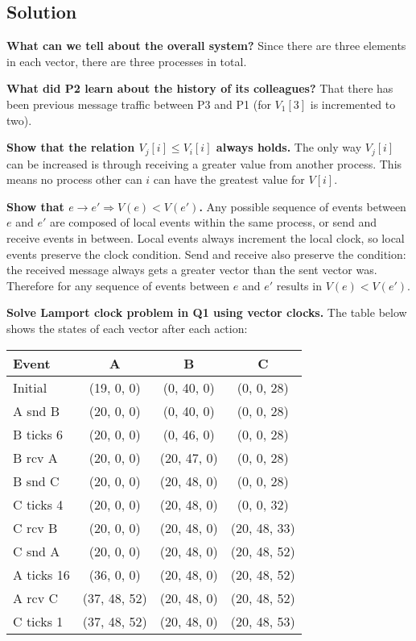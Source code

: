 \documentclass[12pt,a4paper,titlepage]{article}
\begin{document}
\subsection{Solution}

\textbf{What can we tell about the overall system?} Since there are three elements in each vector, there are three processes in total.

\textbf{What did P2 learn about the history of its colleagues?} That there has been previous message traffic between P3 and P1 (for $V_1[3]$ is incremented to two).

\textbf{Show that the relation $V_j[i] \leq V_i[i]$ always holds.} The only way $V_j[i]$ can be increased is through receiving a greater value from another process. This means no process other can $i$ can have the greatest value for $V[i]$.

\textbf{Show that $e \to e' \Rightarrow V(e) < V(e')$.} Any possible sequence of events between $e$ and $e'$ are composed of local events within the same process, or send and receive events in between. Local events always increment the local clock, so local events preserve the clock condition. Send and receive also preserve the condition: the received message always gets a greater vector than the sent vector was. Therefore for any sequence of events between $e$ and $e'$ results in $V(e) < V(e')$.

\textbf{Solve Lamport clock problem in Q1 using vector clocks.} The table below shows the states of each vector after each action:

\begin{tabular}{ | l | c | c | c |} \hline
\textbf{Event} & \textbf{A} & \textbf{B} & \textbf{C} \\ \hline
Initial & (19, 0, 0) & (0, 40, 0) & (0, 0, 28) \\ \hline
A snd B & (20, 0, 0) & (0, 40, 0) & (0, 0, 28) \\ \hline
B ticks 6 & (20, 0, 0) & (0, 46, 0) & (0, 0, 28) \\ \hline
B rcv A & (20, 0, 0) & (20, 47, 0) & (0, 0, 28) \\ \hline
B snd C & (20, 0, 0) & (20, 48, 0) & (0, 0, 28) \\ \hline
C ticks 4 & (20, 0, 0) & (20, 48, 0) & (0, 0, 32) \\ \hline
C rcv B & (20, 0, 0) & (20, 48, 0) & (20, 48, 33) \\ \hline
C snd A & (20, 0, 0) & (20, 48, 0) & (20, 48, 52) \\ \hline
A ticks 16 & (36, 0, 0) & (20, 48, 0) & (20, 48, 52) \\ \hline
A rcv C & (37, 48, 52) & (20, 48, 0) & (20, 48, 52) \\ \hline
C ticks 1 & (37, 48, 52) & (20, 48, 0) & (20, 48, 53) \\ \hline
\end{tabular}
\end{document}

